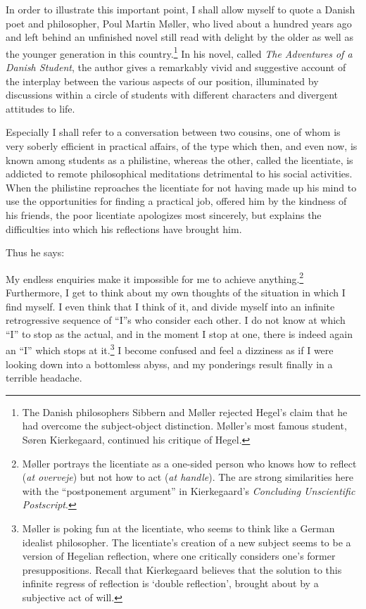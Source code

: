 \documentclass{tufte-handout}
\begin{document}
In order to illustrate this important point, I shall allow myself to
quote a Danish poet and philosopher, Poul Martin M{\o}ller, who lived
about a hundred years ago and left behind an unfinished novel still
read with delight by the older as well as the younger generation in
this country.\footnote{The Danish philosophers Sibbern and M{\o}ller
  rejected Hegel's claim that he had overcome the subject-object
  distinction. M{\o}ller's most famous student, S{\o}ren Kierkegaard,
  continued his critique of Hegel.}  In his novel, called \emph{The
  Adventures of a Danish Student}, the author gives a remarkably vivid
and suggestive account of the interplay between the various aspects of
our position, illuminated by discussions within a circle of students
with different characters and divergent attitudes to life.

Especially I shall refer to a conversation between two cousins, one of
whom is very soberly efficient in practical affairs, of the type which
then, and even now, is known among students as a philistine, whereas
the other, called the licentiate, is addicted to remote philosophical
meditations detrimental to his social activities. When the philistine
reproaches the licentiate for not having made up his mind to use the
opportunities for finding a practical job, offered him by the kindness
of his friends, the poor licentiate apologizes most sincerely, but
explains the difficulties into which his reflections have brought him.

Thus he says:

My endless enquiries make it impossible for me to achieve
anything.\footnote{M{\o}ller portrays the licentiate as a one-sided
  person who knows how to reflect (\emph{at overveje}) but not how to
  act (\emph{at handle}). The are strong similarities here with the
  ``postponement argument'' in Kierkegaard's \emph{Concluding
    Unscientific Postscript}.}  Furthermore, I get to think about my
own thoughts of the situation in which I find myself. I even think
that I think of it, and divide myself into an infinite retrogressive
sequence of ``I''s who consider each other. I do not know at which
``I'' to stop as the actual, and in the moment I stop at one, there is
indeed again an ``I'' which stops at it.\footnote{M{\o}ller is poking
  fun at the licentiate, who seems to think like a German idealist
  philosopher. The licentiate's creation of a new subject seems to be
  a version of Hegelian reflection, where one critically considers
  one's former presuppositions. Recall that Kierkegaard believes that
  the solution to this infinite regress of reflection is `double
  reflection', brought about by a subjective act of will.} I become
confused and feel a dizziness as if I were looking down into a
bottomless abyss, and my ponderings result finally in a terrible
headache.
\end{document}
